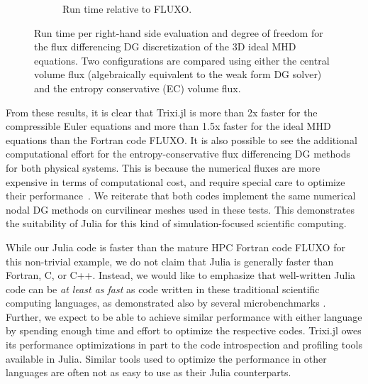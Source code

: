 \documentclass[hidelinks]{juliacon} %
\newcommand{\trixi}{Trixi.jl\xspace}
\begin{document}
\begin{figure}[!ht]
\begin{subfigure}{\linewidth}
    \caption{Run time relative to FLUXO.}
  \end{subfigure}%
  \caption{Run time per right-hand side evaluation and degree of freedom for
           the flux differencing DG discretization of the 3D ideal MHD equations.
           Two configurations are compared using either the central volume flux
           (algebraically equivalent to the weak form DG solver) and the entropy
           conservative (EC) volume flux.}
  \label{fig:PID-MHD}
\end{figure}

From these results, it is clear that \trixi is more than 2x faster for the compressible Euler equations
and more than 1.5x faster for the ideal MHD equations than the Fortran code FLUXO.
It is also possible to see the additional computational effort for the entropy-conservative flux
differencing DG methods for both physical systems. This is because the numerical fluxes are more
expensive in
terms of computational cost, and require special care to optimize their performance~\cite{hendrik_blog,ranocha2021efficient}.
We reiterate that both codes implement the same numerical nodal DG methods on curvilinear meshes used in these tests.
This demonstrates the suitability of Julia for this kind of simulation-focused scientific computing.

While our Julia code is faster than the mature HPC Fortran code FLUXO for this non-trivial
example, we do not claim that Julia is generally faster than Fortran, C, or C++.
Instead, we would like to emphasize that well-written Julia code can be \emph{at least
as fast} as code written in these traditional scientific computing languages,
as demonstrated also by several microbenchmarks \cite{bezanson2017julia}.
Further, we expect to be able to achieve similar performance with either language
by spending enough time and effort to optimize the respective codes.
\trixi owes its performance optimizations in part to the code introspection and
profiling tools available in Julia. Similar tools used to optimize the performance in other
languages are often not as easy to use as their Julia counterparts.
\end{document}
